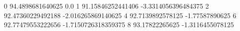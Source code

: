 0 94.4898681640625 0.0
1 91.15846252441406 -3.3314056396484375
2 92.47360229492188 -2.016265869140625
4 92.7139892578125 -1.77587890625
6 92.77479553222656 -1.7150726318359375
8 93.17822265625 -1.3116455078125
